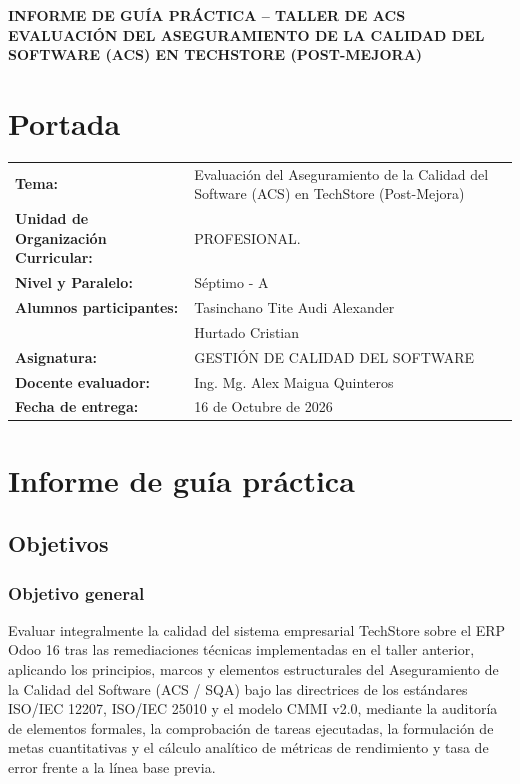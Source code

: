 \documentclass{article}
\begin{document}
\begin{center}
    {\Large \textbf{INFORME DE GUÍA PRÁCTICA -- TALLER DE ACS}} \\[0.2cm]
    {\large \textbf{EVALUACIÓN DEL ASEGURAMIENTO DE LA CALIDAD DEL SOFTWARE (ACS) EN TECHSTORE (POST-MEJORA)}}
\end{center}

\vspace{0.2cm}

\section{Portada}
\begin{flushleft}
\renewcommand{\arraystretch}{1.2}
\begin{tabular}{ p{5.5cm} p{10cm} }
    \textbf{Tema:} & Evaluación del Aseguramiento de la Calidad del Software (ACS) en TechStore (Post-Mejora) \\
    \textbf{Unidad de Organización Curricular:} & PROFESIONAL. \\
    \textbf{Nivel y Paralelo:} & Séptimo - A \\
    \textbf{Alumnos participantes:} & Tasinchano Tite Audi Alexander \\
                                   & Hurtado Cristian \\
    \textbf{Asignatura:} & GESTIÓN DE CALIDAD DEL SOFTWARE \\
    \textbf{Docente evaluador:} & Ing. Mg. Alex Maigua Quinteros \\
    \textbf{Fecha de entrega:} & 16 de Octubre de 2026 \\
\end{tabular}
\end{flushleft}

\vspace{0.3cm}

\section{Informe de guía práctica}

\subsection{Objetivos}
\subsubsection{Objetivo general}
Evaluar integralmente la calidad del sistema empresarial TechStore sobre el ERP Odoo 16 tras las remediaciones técnicas implementadas en el taller anterior, aplicando los principios, marcos y elementos estructurales del Aseguramiento de la Calidad del Software (ACS / SQA) bajo las directrices de los estándares ISO/IEC 12207, ISO/IEC 25010 y el modelo CMMI v2.0, mediante la auditoría de elementos formales, la comprobación de tareas ejecutadas, la formulación de metas cuantitativas y el cálculo analítico de métricas de rendimiento y tasa de error frente a la línea base previa.
\end{document}
